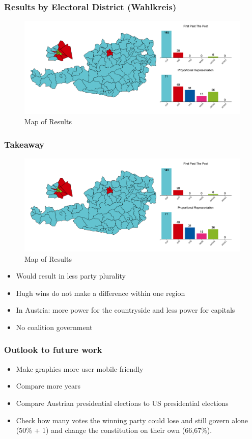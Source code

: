\documentclass{beamer}
\begin{document}
\begin{frame}
\frametitle{Results by Electoral District (Wahlkreis)}
\begin{figure}[h]
  \centering
  \includegraphics[width=0.9\linewidth]{images/mapbywahlbezirken.png}
  \caption{\label{fig:mapOfResults} Map of Results}
\end{figure}
\end{frame}

\begin{frame}
\frametitle{Takeaway}
\begin{figure}[h]
  \centering
  \includegraphics[width=0.9\linewidth]{images/mapbywahlbezirken.png}
  \caption{\label{fig:mapOfResults} Map of Results}
\end{figure}
\begin{itemize}
\item Would result in less party plurality 
\item Hugh wins do not make a difference within one region
\item In Austria: more power for the countryside and less power for capitals
\item No coalition government 
\end{itemize}
\end{frame}


\begin{frame}
\frametitle{Outlook to future work}
\begin{itemize}
\item Make graphics more user mobile-friendly 
\item Compare more years
\item Compare Austrian presidential elections to US presidential elections
\item Check how many votes the winning party could lose and still govern alone (50\% + 1) and change the constitution on their own (66,67\%).
\end{itemize}
\end{frame}
\end{document}
